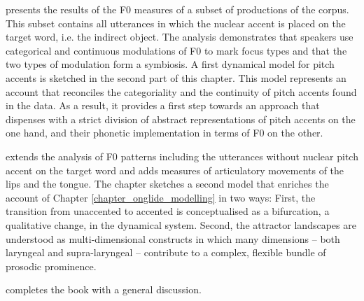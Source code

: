  presents the results of the F0 measures of a subset of productions of the corpus. This subset contains all utterances in which the nuclear accent is placed on the target word, i.e. the indirect object. The analysis demonstrates that speakers use categorical and continuous modulations of F0 to mark focus types and that the two types of modulation form a symbiosis. A first dynamical model for pitch accents is sketched in the second part of this chapter. This model represents an account that reconciles the categoriality and the continuity of pitch accents found in the data. As a result, it provides a first step towards an approach that dispenses with a strict division of abstract representations of pitch accents on the one hand, and their phonetic implementation in terms of F0 on the other.

 extends the analysis of F0 patterns including the utterances without nuclear pitch accent on the target word and adds measures of articulatory movements of the lips and the tongue. The chapter  sketches a second model that enriches the account of Chapter \ref{chapter_onglide_modelling} in two ways: First, the transition from unaccented to accented is conceptualised as a bifurcation, a qualitative change, in the dynamical system. Second, the attractor landscapes are understood as multi-dimensional constructs in which many dimensions -- both laryngeal and supra-laryngeal -- contribute to a complex, flexible bundle of prosodic prominence.

 completes the book with a general discussion.

